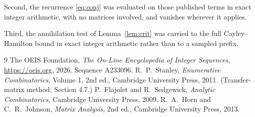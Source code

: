 \documentclass[11pt,a4paper]{article}
\theoremstyle{plain}
\theoremstyle{definition}
\begin{document}
Second, the recurrence \eqref{eq:conj} was evaluated on those published terms in exact
integer arithmetic, with no matrices involved, and vanishes wherever it applies.

Third, the annihilation test of Lemma~\ref{lem:crit} was carried to the full
Cayley--Hamilton bound in exact integer arithmetic rather than to a sampled prefix.

\begin{thebibliography}{9}
 The OEIS Foundation, \emph{The On-Line Encyclopedia of Integer
Sequences}, \url{https://oeis.org}, 2026. Sequence A233096.
 R.~P.~Stanley, \emph{Enumerative Combinatorics}, Volume 1, 2nd ed.,
Cambridge University Press, 2011. (Transfer-matrix method, Section 4.7.)
 P.~Flajolet and R.~Sedgewick, \emph{Analytic Combinatorics}, Cambridge
University Press, 2009.
 R.~A.~Horn and C.~R.~Johnson, \emph{Matrix Analysis}, 2nd ed., Cambridge
University Press, 2013.
\end{thebibliography}
\end{document}
